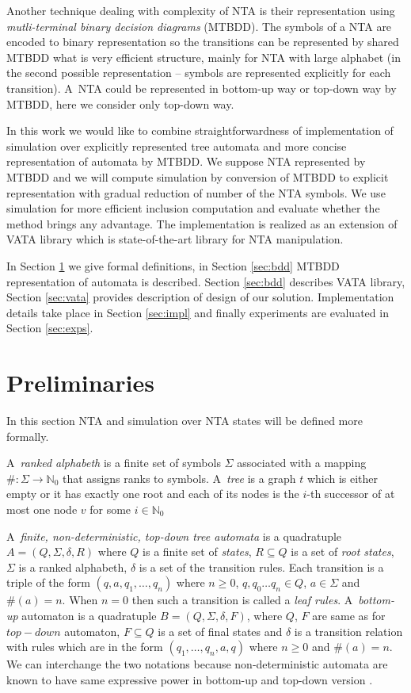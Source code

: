 \documentclass[a4paper, 12pt]{article}
\begin{document}
Another technique dealing with complexity of NTA is their representation using \textit{mutli-terminal binary decision diagrams} (MTBDD).
The symbols of a NTA are encoded to binary representation so the transitions can be represented by shared MTBDD what is very  efficient structure,  mainly for NTA with large alphabet
(in the second possible representation -- symbols are represented explicitly for each transition).
A~NTA could be represented in bottom-up way or top-down way by MTBDD, here we consider only top-down way.

In this work we would like to combine straightforwardness of implementation of simulation over explicitly
represented tree automata and more concise representation of automata by MTBDD.
We suppose NTA represented by MTBDD and we will compute simulation by conversion of MTBDD
to explicit representation with gradual reduction of number of the NTA symbols.
We use simulation for more efficient inclusion computation and evaluate whether the method brings any advantage.
The implementation is realized as an extension of VATA library which is state-of-the-art library for NTA manipulation.

In Section \ref{sec:analysis} we give formal definitions, in Section \ref{sec:bdd} MTBDD representation of automata is described.
Section \ref{sec:bdd} describes VATA library, Section \ref{sec:vata} provides description of design of our solution.
Implementation details take place in Section \ref{sec:impl} and finally experiments are evaluated in Section \ref{sec:exps}.

\section{Preliminaries}
\label{sec:analysis}
In this section NTA and simulation over NTA states will be defined more formally.

A~\emph{ranked alphabeth} is a finite set of symbols $\Sigma$ associated with a mapping $\#: \Sigma \rightarrow \mathbb{N}_0$
that assigns ranks to symbols. A~\emph{tree} is a graph $t$ which is either empty or it has exactly one root and each of its
nodes is the $i$-th successor of at most one node $v$ for some $i \in \mathbb{N}_0$

A~\emph{finite, non-deterministic, top-down tree automata} is a quadratuple $A=(Q, \Sigma, \delta, R)$ where
$Q$ is a finite set of \emph{states}, $R\subseteq Q$ is a set of \emph{root states}, $\Sigma$ is a ranked alphabeth,
$\delta$ is a set of the transition rules.
Each transition is a triple of the form $(q,a,q_1, \ldots, q_n)$ where $n \geq 0$, $q, q_0 \ldots q_n \in Q$, $a \in \Sigma$ and $\#(a) = n$.
When $n = 0$ then such a transition is called a \emph{leaf rules}.
A~\emph{bottom-up} automaton is a quadratuple $B=(Q, \Sigma, \delta, F)$, where $Q$, $F$ are same as for $top-down$ automaton, $F\subseteq Q$
is a set of final states and $\delta$ is a transition relation with rules which are in the form $(q_1,\ldots, q_n,a,q)$ where $n \geq 0$ and $\#(a) = n$.
We can interchange the two notations because non-deterministic automata are known to have same expressive power in bottom-up and top-down version \cite{tata}.
\end{document}
